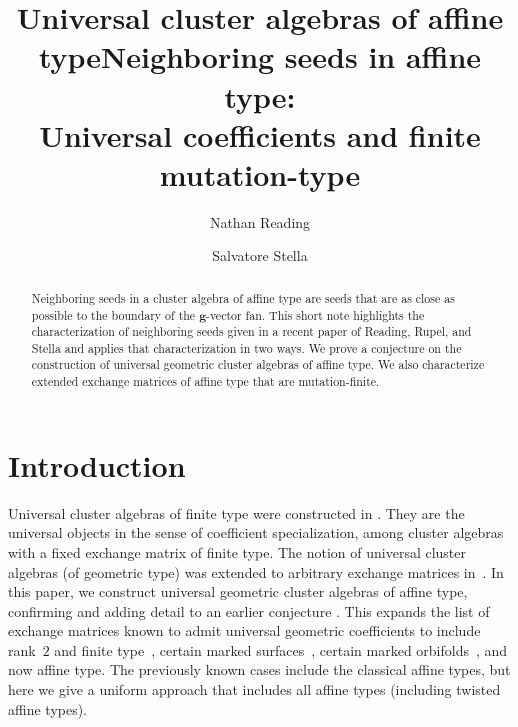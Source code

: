 \documentclass{amsart}
\author{Nathan Reading}
\author{Salvatore Stella}
\title{Universal cluster algebras of affine type}
\title[Neighboring seeds, universal coefficients, finite mutation-type]{Neighboring seeds in affine type: \\Universal coefficients and finite mutation-type}
\theoremstyle{definition}
\theoremstyle{remark}
\numberwithin{equation}{section}
\newcommand{\0}{{\mathbf{0}}}
\newcommand{\g}{\mathbf{g}}
\begin{document}
\begin{abstract}
Neighboring seeds in a cluster algebra of affine type are seeds that are as close as possible to the boundary of the $\g$-vector fan.
This short note highlights the characterization of neighboring seeds given in a recent paper of Reading, Rupel, and Stella and applies that characterization in two ways.
We prove a conjecture on the construction of universal geometric cluster algebras of affine type.
We also characterize extended exchange matrices of affine type that are mutation-finite.
\end{abstract}

\maketitle


\setcounter{tocdepth}{1}
\tableofcontents


\section{Introduction}
Universal cluster algebras of finite type were constructed in \cite[Section~12]{ca4}.
They are the universal objects in the sense of coefficient specialization, among cluster algebras with a fixed exchange matrix of finite type.
The notion of universal cluster algebras (of geometric type) was extended to arbitrary exchange matrices in~\cite{universal}. 
In this paper, we construct universal geometric cluster algebras of affine type, confirming and adding detail to an earlier conjecture \cite[Conjecture~10.15]{universal}.
This expands the list of exchange matrices known to admit universal geometric coefficients to include rank~$2$ and finite type~\cite{universal}, certain marked surfaces~\cite{unisurface,unitorus,unisphere,unidread}, certain marked orbifolds~\cite{VielThesis}, and now affine type.
The previously known cases include the classical affine types, but here we give a uniform approach that includes all affine types (including twisted affine types).
\end{document}
